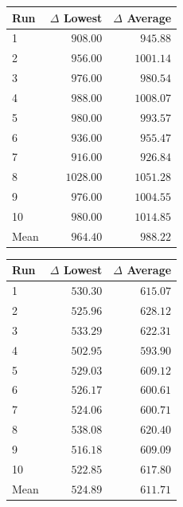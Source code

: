 \begin{table}[H]
    \centering
    \begin{minipage}[t]{0.48\textwidth}
        \centering
        \label{tab:gain-binary-regular}
        \small
        \setlength{\tabcolsep}{4pt}
        \begin{tabular}{lrr}
            \toprule
            \textbf{Run} & \textbf{$\Delta$ Lowest} & \textbf{$\Delta$ Average} \\
            \midrule
            1 & $908.00$ & $945.88$ \\
            2 & $956.00$ & $1001.14$ \\
            3 & $976.00$ & $980.54$ \\
            4 & $988.00$ & $1008.07$ \\
            5 & $980.00$ & $993.57$ \\
            6 & $936.00$ & $955.47$ \\
            7 & $916.00$ & $926.84$ \\
            8 & $1028.00$ & $1051.28$ \\
            9 & $976.00$ & $1004.55$ \\
            10 & $980.00$ & $1014.85$ \\
            \midrule
            Mean & $964.40$ & $988.22$ \\
            \bottomrule
        \end{tabular}
    \end{minipage}
    \hfill
    \begin{minipage}[t]{0.48\textwidth}
        \centering
        \label{tab:gain-uniform-erdos-renyi}
        \small
        \setlength{\tabcolsep}{4pt}
        \begin{tabular}{lrr}
            \toprule
            \textbf{Run} & \textbf{$\Delta$ Lowest} & \textbf{$\Delta$ Average} \\
            \midrule
            1 & $530.30$ & $615.07$ \\
            2 & $525.96$ & $628.12$ \\
            3 & $533.29$ & $622.31$ \\
            4 & $502.95$ & $593.90$ \\
            5 & $529.03$ & $609.12$ \\
            6 & $526.17$ & $600.61$ \\
            7 & $524.06$ & $600.71$ \\
            8 & $538.08$ & $620.40$ \\
            9 & $516.18$ & $609.09$ \\
            10 & $522.85$ & $617.80$ \\
            \midrule
            Mean & $524.89$ & $611.71$ \\
            \bottomrule
        \end{tabular}
    \end{minipage}
\end{table}

